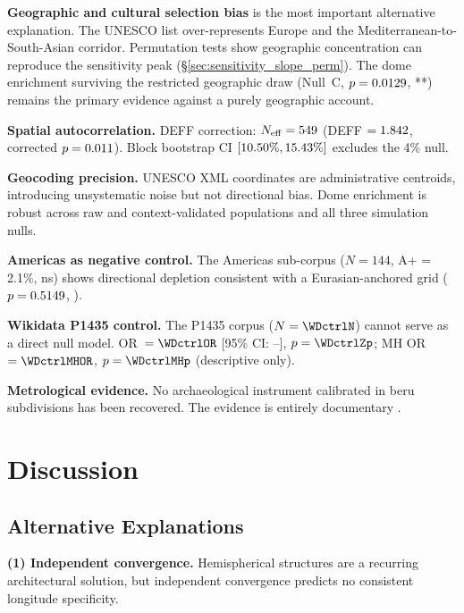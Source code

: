 \documentclass[12pt,a4paper]{article}
\begin{document}
\textbf{Geographic and cultural selection bias}
is the most important alternative explanation. The UNESCO list
over-represents Europe and the Mediterranean-to-South-Asian corridor.
Permutation tests show geographic concentration can reproduce the
sensitivity peak (\S\ref{sec:sensitivity_slope_perm}). The dome
enrichment surviving the restricted geographic draw (Null~C,
$p = 0.0129$, **) remains the primary evidence against
a purely geographic account.

\textbf{Spatial autocorrelation.}
DEFF correction: $N_\mathrm{eff} = 549$ (DEFF $= 1.842$,
corrected $p = 0.011$). Block bootstrap CI
$[10.50\%, 15.43\%]$ excludes the 4\% null.

\textbf{Geocoding precision.}
UNESCO XML coordinates are administrative centroids, introducing
unsystematic noise but not directional bias. Dome enrichment is robust
across raw and context-validated populations and all three simulation nulls.

\textbf{Americas as negative control.}
The Americas sub-corpus ($N = 144$, A+ = 2.1\%, ns) shows directional
depletion consistent with a Eurasian-anchored grid ($p = 0.5149$,
\AmericasOneSidedStar).

\textbf{Wikidata P1435 control.}
The P1435 corpus ($N = \WDctrlN$) cannot serve as a direct null model.
OR~$= \WDctrlOR$ [95\% CI: \WDctrlORlo--\WDctrlORhi],
$p = \WDctrlZp$; MH OR~$= \WDctrlMHOR$, $p = \WDctrlMHp$ (descriptive only).

\textbf{Metrological evidence.}
No archaeological instrument calibrated in beru subdivisions has been
recovered. The evidence is entirely documentary
\citep{hunger2019mul,robson2008mathematics,powell1987metrological}.

\section{Discussion}
\label{sec:discussion}

\subsection{Alternative Explanations}
\label{sec:alt_explanations}

\textbf{(1) Independent convergence.}
Hemispherical structures are a recurring architectural solution, but
independent convergence predicts no consistent longitude specificity.
\end{document}
